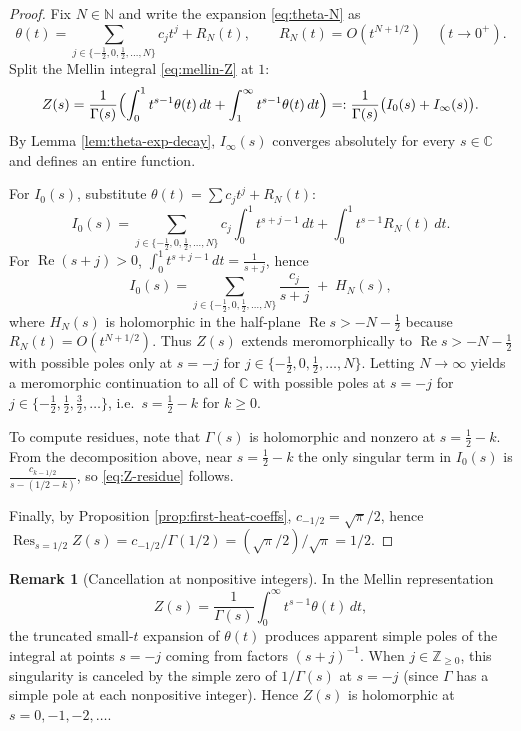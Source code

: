 \documentclass[11pt,letterpaper]{amsart}
\numberwithin{equation}{section}
\theoremstyle{definition}
\newtheorem{remark}[theorem]{Remark}
\newcommand{\C}{\mathbb{C}}
\newcommand{\N}{\mathbb{N}}
\newcommand{\Ree}{\operatorname{Re}}
\begin{document}
\begin{proof}
Fix $N\in\N$ and write the expansion \eqref{eq:theta-N} as
\[
\theta(t)=\sum_{j\in\{-\tfrac12,0,\tfrac12,\dots,N\}} c_j t^{j} + R_N(t),
\qquad R_N(t)=O(t^{N+1/2})\quad(t\to 0^+).
\]
Split the Mellin integral \eqref{eq:mellin-Z} at $1$:
\[
Z(s)=\frac{1}{\Gamma(s)}\Bigl(\int_0^1 t^{s-1}\theta(t)\,dt+\int_1^\infty t^{s-1}\theta(t)\,dt\Bigr)
=: \frac{1}{\Gamma(s)}\bigl(I_0(s)+I_\infty(s)\bigr).
\]
By Lemma \ref{lem:theta-exp-decay}, $I_\infty(s)$ converges absolutely for every $s\in\C$ and defines an entire function.

For $I_0(s)$, substitute $\theta(t)=\sum c_j t^j + R_N(t)$:
\[
I_0(s)=\sum_{j\in\{-\tfrac12,0,\tfrac12,\dots,N\}} c_j\int_0^1 t^{s+j-1}\,dt + \int_0^1 t^{s-1}R_N(t)\,dt.
\]
For $\Ree(s+j)>0$, $\int_0^1 t^{s+j-1}\,dt=\frac{1}{s+j}$, hence
\[
I_0(s)=\sum_{j\in\{-\tfrac12,0,\tfrac12,\dots,N\}}\frac{c_j}{s+j}\;+\; H_N(s),
\]
where $H_N(s)$ is holomorphic in the half-plane $\Ree s>-N-\tfrac12$ because $R_N(t)=O(t^{N+1/2})$.
Thus $Z(s)$ extends meromorphically to $\Ree s>-N-\tfrac12$ with possible poles only at $s=-j$
for $j\in\{-\tfrac12,0,\tfrac12,\dots,N\}$.
Letting $N\to\infty$ yields a meromorphic continuation to all of $\C$ with possible poles at
$s=-j$ for $j\in \{-\tfrac12,\tfrac12,\tfrac32,\dots\}$, i.e.\ $s=\tfrac12-k$ for $k\ge 0$.

To compute residues, note that $\Gamma(s)$ is holomorphic and nonzero at $s=\tfrac12-k$.
From the decomposition above, near $s=\tfrac12-k$ the only singular term in $I_0(s)$ is
$\frac{c_{k-1/2}}{s-(1/2-k)}$, so \eqref{eq:Z-residue} follows.

Finally, by Proposition \ref{prop:first-heat-coeffs}, $c_{-1/2}=\sqrt{\pi}/2$, hence
$\operatorname{Res}_{s=1/2}Z(s)=c_{-1/2}/\Gamma(1/2)=(\sqrt{\pi}/2)/\sqrt{\pi}=1/2$.
\end{proof}

\begin{remark}[Cancellation at nonpositive integers]\label{rem:gamma-cancellation}
In the Mellin representation
\[
Z(s)=\frac{1}{\Gamma(s)}\int_0^\infty t^{s-1}\theta(t)\,dt,
\]
the truncated small-$t$ expansion of $\theta(t)$ produces apparent simple poles of the integral
at points $s=-j$ coming from factors $(s+j)^{-1}$. When $j\in\mathbb{Z}_{\ge0}$, this singularity
is canceled by the simple zero of $1/\Gamma(s)$ at $s=-j$ (since $\Gamma$ has a simple pole at
each nonpositive integer). Hence $Z(s)$ is holomorphic at $s=0,-1,-2,\dots$.
\end{remark}
\end{document}

